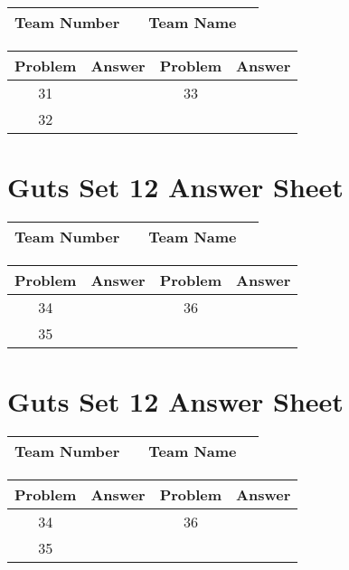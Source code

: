 \documentclass[14pt]{article}
\begin{document}
\begin{center}
\begin{tabular}{|r|r|r|r|}
\hline
	Team Number & \hspace{10em} &
	Team Name & \hspace{15em} \\ \hline
\end{tabular}
\end{center}
\begin{tabularx}{\textwidth}{|c|l|c|X|}\hline
	Problem & Answer & Problem & Answer \\\hline
	31 & \hspace{15em} & 33 & \\\hline
	32 & & & \\\hline
\end{tabularx}

\section*{Guts Set 12 Answer Sheet}

\begin{center}
\begin{tabular}{|r|r|r|r|}
\hline
	Team Number & \hspace{10em} &
	Team Name & \hspace{15em} \\ \hline
\end{tabular}
\end{center}
\begin{tabularx}{\textwidth}{|c|l|c|X|}\hline
	Problem & Answer & Problem & Answer \\\hline
	34 & \hspace{15em} & 36 & \\\hline
	35 & & & \\\hline
\end{tabularx}

\vspace{30px}

\section*{Guts Set 12 Answer Sheet}

\begin{center}
\begin{tabular}{|r|r|r|r|}
\hline
	Team Number & \hspace{10em} &
	Team Name & \hspace{15em} \\ \hline
\end{tabular}
\end{center}
\begin{tabularx}{\textwidth}{|c|l|c|X|}\hline
	Problem & Answer & Problem & Answer \\\hline
	34 & \hspace{15em} & 36 & \\\hline
	35 & & & \\\hline
\end{tabularx}
\end{document}
